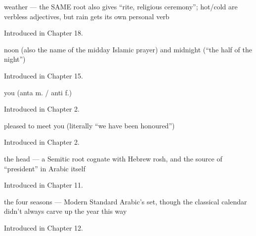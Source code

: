 \noindent\begin{minipage}[t]{\linewidth}
\raggedright
\textbf{}\par
\small weather — the SAME root also gives \textquotedblleft{}rite, religious ceremony\textquotedblright{}; hot/cold are verbless adjectives, but rain gets its own personal verb\par
\footnotesize Introduced in Chapter 18.
\end{minipage}\par\medskip

\noindent\begin{minipage}[t]{\linewidth}
\raggedright
\textbf{  }\par
\small noon (also the name of the midday Islamic prayer) and midnight (\textquotedblleft{}the half of the night\textquotedblright{})\par
\footnotesize Introduced in Chapter 15.
\end{minipage}\par\medskip

\noindent\begin{minipage}[t]{\linewidth}
\raggedright
\textbf{}\par
\small you (anta m. / anti f.)\par
\footnotesize Introduced in Chapter 2.
\end{minipage}\par\medskip

\noindent\begin{minipage}[t]{\linewidth}
\raggedright
\textbf{}\par
\small pleased to meet you (literally \textquotedblleft{}we have been honoured\textquotedblright{})\par
\footnotesize Introduced in Chapter 2.
\end{minipage}\par\medskip

\noindent\begin{minipage}[t]{\linewidth}
\raggedright
\textbf{}\par
\small the head — a Semitic root cognate with Hebrew rosh, and the source of \textquotedblleft{}president\textquotedblright{} in Arabic itself\par
\footnotesize Introduced in Chapter 11.
\end{minipage}\par\medskip

\noindent\begin{minipage}[t]{\linewidth}
\raggedright
\textbf{   }\par
\small the four seasons — Modern Standard Arabic's set, though the classical calendar didn't always carve up the year this way\par
\footnotesize Introduced in Chapter 12.
\end{minipage}\par\medskip

